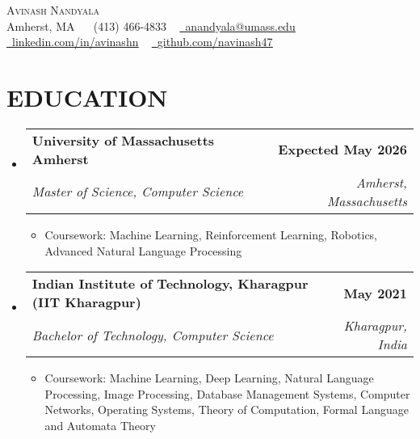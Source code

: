 \documentclass[letterpaper,10pt]{article}
\makeatletter
\newcommand{\resumeItem}[1]{
  \item\small{
    {#1 \vspace{-3pt}}
  }
}
\newcommand{\resumeSubheading}[4]{
  \vspace{-3pt}\item
    \begin{tabular*}{1.0\textwidth}[t]{l@{\extracolsep{\fill}}r}
      \textbf{#1} & \textbf{\small #2} \\
      \textit{\small#3} & \textit{\small #4} \\
    \end{tabular*}\vspace{-8pt}
}
\newcommand{\resumeSubHeadingListStart}{\begin{itemize}[leftmargin=0.0in, label={}]}
\newcommand{\resumeSubHeadingListEnd}{\end{itemize}}
\newcommand{\resumeItemListStart}{\begin{itemize}}
\newcommand{\resumeItemListEnd}{\end{itemize}\vspace{-5pt}}
\makeatother
\begin{document}
\fontsize{8pt}{10pt}\selectfont  %


\begin{center}
    {\Huge \scshape Avinash Nandyala} \\ \vspace{0pt}
    Amherst, MA ~ \raisebox{-0.1\height}\faPhone\ (413) 466-4833 ~ 
    \href{mailto:anandyala@umass.edu}{\raisebox{-0.2\height}\faEnvelope\  \underline{anandyala@umass.edu}} ~ 
    \href{https://www.linkedin.com/in/avinash-nandyala-06a88b199/}{\raisebox{-0.2\height}\faLinkedin\ \underline{linkedin.com/in/avinashn}}  ~
    \href{https://github.com/navinash47}{\raisebox{-0.2\height}\faGithub\ \underline{github.com/navinash47}}\\
    \vspace{-9pt}
\end{center}

\section{EDUCATION}
  \resumeSubHeadingListStart
    \resumeSubheading
      {University of Massachusetts Amherst}{Expected May 2026}
      {Master of Science, Computer Science}{Amherst, Massachusetts}
      \resumeItemListStart
        \resumeItem{Coursework: Machine Learning, Reinforcement Learning, Robotics, Advanced Natural Language Processing}
      \resumeItemListEnd
      
    \resumeSubheading
      {Indian Institute of Technology, Kharagpur (IIT Kharagpur)}{May 2021}
      {Bachelor of Technology, Computer Science}{Kharagpur, India}
      \resumeItemListStart
        \resumeItem{Coursework: Machine Learning, Deep Learning, Natural Language Processing, Image Processing, Database Management Systems, Computer Networks, Operating Systems, Theory of Computation, Formal Language and Automata Theory}
      \resumeItemListEnd
  \resumeSubHeadingListEnd
\end{document}
